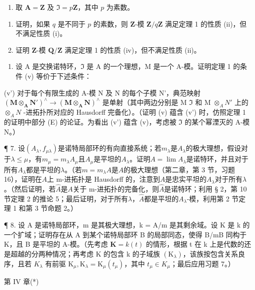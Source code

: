 \begin{enumerate}
\def\labelenumi{\arabic{enumi}.}
\setcounter{enumi}{4}
\tightlist
\item
  取 \(\mathbf{A} = \mathbf{Z}\) 及 \(\mathfrak{I} = p\mathbf{Z}\)，其中 \(p\) 为素数。
\end{enumerate}

\begin{enumerate}
\def\labelenumi{(\alph{enumi})}
\item
  证明，如果 \(q\) 是不同于 \(p\) 的素数，则 \(\mathbf{Z}\)-模 \(\mathbf{Z} / q\mathbf{Z}\) 满足定理 1 的性质 (ii)，但不满足性质 (i)。
\item
  证明 \(\mathbf{Z}\)-模 \(\mathbf{Q} / \mathbf{Z}\) 满足定理 1 的性质 (iv)，但不满足性质 (ii)。
\end{enumerate}

\begin{enumerate}
\def\labelenumi{\arabic{enumi}.}
\setcounter{enumi}{5}
\tightlist
\item
  设 A 是交换诺特环，\(\mathfrak{I}\) 是 A 的一个理想，M 是一个 A-模。证明定理 1 的条件 (v) 等价于下述条件：
\end{enumerate}

(v') 对于每个有限生成的 A-模 N 及 N 的每个子模 N'，典范映射 \((\mathbf{M} \otimes_{\mathbf{A}} \mathbf{N}')^{\wedge} \to (\mathbf{M} \otimes_{\mathbf{A}} \mathbf{N})^{\wedge}\) 是单射（其中两边分别是 M \(\mathfrak{I}\) 和 M \(\otimes_{A} N'\) 上的 \(\otimes_{A} N\) -进拓扑所对应的 Hausdorff 完备化）。（证明 (v) 蕴含 (v') 时，仿照定理 1 的证明中部分 (E) 的论证。为看出 (v') 蕴含 (v)，考虑被 \(\mathfrak{I}\) 的某个幂湮灭的 A-模 N。）

¶ 7. 设\((A_{\lambda}, f_{\mu\lambda})\)是诺特局部环的有向直接系统；若\(m_{\lambda}\)是\(A_{\lambda}\)的极大理想，假设对于\(\lambda \leqslant \mu\)，有\(m_{\mu} = m_{\lambda}A_{\mu}\)且\(A_{\mu}\)是平坦的\(A_{\lambda}\)。证明\(A = \lim A_{\lambda}\)是诺特环，并且对于所有\(A_{\lambda}\)都是平坦的\(\lambda\)。（若\(m = m_{\lambda}A\)是\(A\)的极大理想（第二章，第 3 节，习题 16），证明在\(A\)上 m-进拓扑是 Hausdorff 的，注意到\(A\)是忠实平坦的\(A_{\lambda}\)对于所有\(\lambda\)。（然后证明，若\(\hat{A}\)是\(A\)关于 m-进拓扑的完备化，则\(\hat{A}\)是诺特环；利用 § 2，第 10 节定理 2 的推论 5；最后证明，对于所有\(\lambda\)，\(\hat{A}\)都是平坦的\(A_{\lambda}\)-模，利用第 2 节定理 1 和第 3 节命题 2。）

¶ 8. 设 A 是诺特局部环，m 是其极大理想，k = A/m 是其剩余域。设 K 是 k 的一个扩域；证明存在从 A 到某个诺特局部环 B 的局部同态，使得 B/mB 同构于 K，且 B 是平坦的 A-模。（先考虑 \(\mathbf{K} = k(t)\) 的情形，根据 t 在 k 上是代数的还是超越的分两种情况；再考虑 K 的包含 k 的子域族 \((\mathrm{K}_{\lambda})\)，该族按包含关系良序，且若 \(K_{\lambda}\) 有前驱 \(\mathrm{K}_{\mu}, \mathrm{K}_{\lambda} = \mathrm{K}_{\mu}(t_{\mu})\)，其中 \(t_{\mu} \in K_{\mu}\)；最后应用习题 7。）

第 IV 章(*)

